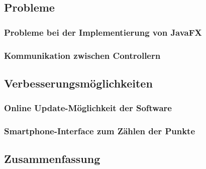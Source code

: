 \subsection{Probleme}
\subsubsection{Probleme bei der Implementierung von JavaFX}
\subsubsection{Kommunikation zwischen Controllern}
\subsection{Verbesserungsmöglichkeiten}
\subsubsection{Online Update-Möglichkeit der Software}
\subsubsection{Smartphone-Interface zum Zählen der Punkte}
\subsection{Zusammenfassung}